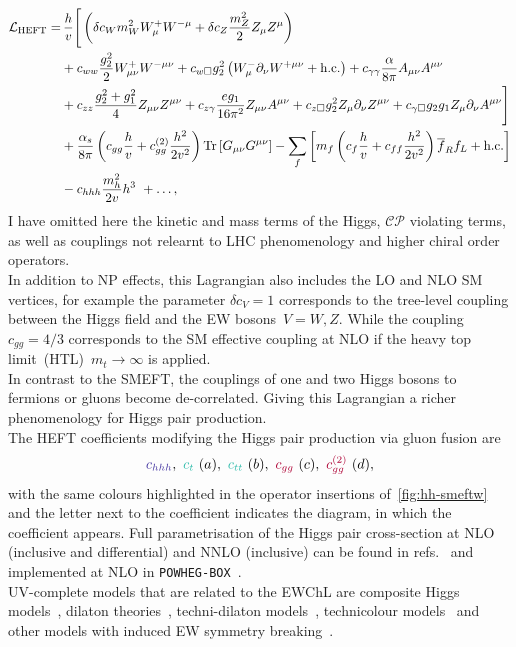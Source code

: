 \begin{align}\nonumber
	\mathcal{L}_{\mathrm{HEFT}} = & \, \frac{h}{v} \Bigg[  \left( \delta c_W m_W^2 W_{\mu}^+W^{-\mu} +\delta c_Z \frac{m_Z^2}{2} Z_\mu Z^\mu\right)  \\\nonumber
	&+c_{ww}\frac{g_2^2}{2}W_{\mu\nu}^+W^{-\mu\nu} + c_{w\square} g_2^2\left(W_{\mu}^-\partial_\nu W^{+\mu\nu} + \text{h.c.}\right) +  c_{\gamma\gamma}\frac{\alpha}{8 \pi}A_{\mu\nu}A^{\mu\nu} \\\nonumber
	& +c_{zz}\frac{g_2^2 + g_1^2}{4} Z_{\mu\nu}Z^{\mu\nu}+ c_{z\gamma}\frac{e g_1}{16 \pi^2}Z_{\mu\nu}A^{\mu\nu}
	+c_{z\square}g_2^2Z_\mu\partial_\nu Z^{\mu\nu}
	+c_{\gamma \square}g_2 g_1 Z_\mu\partial_\nu A^{\mu\nu}
	\Bigg]\\\nonumber
	&+ \frac{\alpha_s}{8 \pi} \left( c_{gg} \frac{h}{v} +  c_{gg}^{(2)} \frac{h^2}{2 v^2}\right) \mbox{Tr}\,[G_{\mu\nu} G^{\mu\nu}]
	-\sum_f \left[ m_f \left(c_f \frac{h}{v} + c _{ff} \frac{h^2}{2v^2}\right) \overline{f}_{R}f_{L}+\text{h.c.}\right]\\
	& - c_{hhh} \frac{m_h^2}{2 v} h^3\ + \dots,\label{eq:coupl_def}
\end{align}
I have omitted here the kinetic and mass terms of the Higgs, $\mathcal{CP}$ violating terms, as well as couplings not relearnt to LHC phenomenology and higher chiral order operators. \\
In addition to NP effects, this Lagrangian also includes the LO and NLO SM vertices, for example the parameter $\delta c_V=1$ corresponds to the tree-level coupling between the Higgs field and the EW bosons~$ V=W, Z$. While the coupling $c_{gg}= 4/3$ corresponds to the SM effective coupling at NLO if the heavy top limit~(HTL)~$m_t \to \infty$ is applied. \\
In contrast to the SMEFT, the couplings of one and two Higgs bosons to fermions or gluons become de-correlated. Giving this Lagrangian a richer phenomenology for Higgs pair production.  \\
The HEFT coefficients modifying the Higgs pair production via gluon fusion are 
\begin{equation}
	\textcolor[HTML]{4334a0}{c_{hhh} }, \ 	\textcolor[HTML]{2ebbaa}{c_t}\ (a) , \  	\textcolor[HTML]{2ebbaa}{c_{tt}} \ (b), \  \textcolor[HTML]{ae0034}{c_{gg}} \ (c), \  \textcolor[HTML]{ae0034}{c_{gg}^{(2)}} \ (d),
\end{equation}
with the same colours highlighted in the operator insertions of~\autoref{fig:hh-smeftw} and the letter next to the coefficient indicates the diagram, in which the coefficient appears.  Full parametrisation of the Higgs pair cross-section at NLO (inclusive and differential) and NNLO (inclusive) can be found in refs.~\cite{Buchalla:2018yce,Capozi:2019xsi,deFlorian:2021azd} and implemented at NLO in \texttt{POWHEG-BOX}~\cite{Heinrich:2020ckp}. \\ UV-complete models that are related to the EWChL are composite Higgs models~\cite{Contino:2010rs,Panico:2015jxa,AGASHE2005165}, dilaton theories~\cite{PhysRevLett.100.111802}, techni-dilaton models~\cite{Habaa:2010rbs}, technicolour models~\cite{Delgado:2010bb} and other models with induced EW symmetry breaking~\cite{Galloway:2013dma,Chang:2014ida}.
